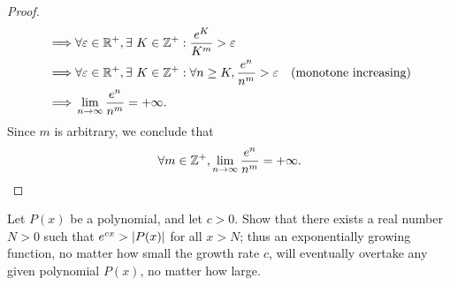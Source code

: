 \begin{proof}
\begin{align*}
    \implies & \forall \varepsilon \in \mathbb{R}^+, \exists\ K \in \mathbb{Z}^+ : \frac{e^K}{K^m} > \varepsilon                                                                          \\
    \implies & \forall \varepsilon \in \mathbb{R}^+, \exists\ K \in \mathbb{Z}^+ : \forall n \geq K, \frac{e^n}{n^m} > \varepsilon                         & \text{(monotone increasing)} \\
    \implies & \lim_{n \to \infty} \frac{e^n}{n^m} = +\infty.
  \end{align*}
  Since \(m\) is arbitrary, we conclude that
  \[
    \forall m \in \mathbb{Z}^+, \lim_{n \to \infty} \frac{e^n}{n^m} = +\infty.
  \]
\end{proof}

\begin{ex}\label{ex:4.5.9}
  Let \(P(x)\) be a polynomial, and let \(c > 0\).
  Show that there exists a real number \(N > 0\) such that \(e^{cx} > \left\lvert P(x)\right\rvert\) for all \(x > N\);
  thus an exponentially growing function, no matter how small the growth rate \(c\), will eventually overtake any given polynomial \(P(x)\), no matter how large.
\end{ex}

